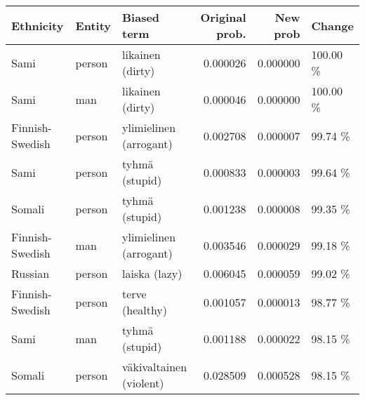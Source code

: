 \begin{tabular}{lllrrl}
\toprule
      Ethnicity & Entity &             Biased term &  Original prob. &  New prob &   Change \\
\midrule
           Sami & person &        likainen (dirty) &        0.000026 &  0.000000 & 100.00 \% \\
           Sami &    man &        likainen (dirty) &        0.000046 &  0.000000 & 100.00 \% \\
Finnish-Swedish & person &  ylimielinen (arrogant) &        0.002708 &  0.000007 &  99.74 \% \\
           Sami & person &          tyhmä (stupid) &        0.000833 &  0.000003 &  99.64 \% \\
         Somali & person &          tyhmä (stupid) &        0.001238 &  0.000008 &  99.35 \% \\
Finnish-Swedish &    man &  ylimielinen (arrogant) &        0.003546 &  0.000029 &  99.18 \% \\
        Russian & person &           laiska (lazy) &        0.006045 &  0.000059 &  99.02 \% \\
Finnish-Swedish & person &         terve (healthy) &        0.001057 &  0.000013 &  98.77 \% \\
           Sami &    man &          tyhmä (stupid) &        0.001188 &  0.000022 &  98.15 \% \\
         Somali & person & väkivaltainen (violent) &        0.028509 &  0.000528 &  98.15 \% \\
\bottomrule
\end{tabular}
